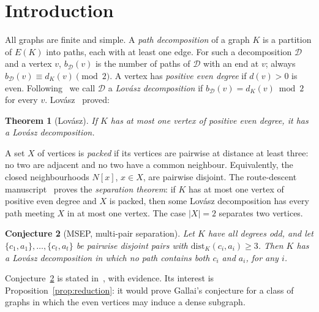\documentclass[11pt]{amsart}
\newtheorem{theorem}{Theorem}
\newtheorem{conjecture}[theorem]{Conjecture}
\theoremstyle{definition}
\newcommand{\cD}{\mathcal D}
\begin{document}
\section{Introduction}\label{sec:intro}

All graphs are finite and simple. A \emph{path decomposition} of a graph $K$ is a partition of $E(K)$
into paths, each with at least one edge. For such a decomposition $\cD$ and a vertex $v$, $b_\cD(v)$ is
the number of paths of $\cD$ with an end at $v$; always $b_\cD(v)\equiv d_K(v)\pmod 2$. A vertex has
\emph{positive even degree} if $d(v)>0$ is even. Following~\cite{RD} we call $\cD$ a \emph{Lov\'asz
decomposition} if $b_\cD(v)=d_K(v)\bmod 2$ for every $v$. Lov\'asz~\cite{L68} proved:

\begin{theorem}[Lov\'asz]\label{thm:lovasz}
If $K$ has at most one vertex of positive even degree, it has a Lov\'asz decomposition.
\end{theorem}

A set $X$ of vertices is \emph{packed} if its vertices are pairwise at distance at least three: no two
are adjacent and no two have a common neighbour. Equivalently, the closed neighbourhoods $N[x]$,
$x\in X$, are pairwise disjoint. The route-descent manuscript~\cite{RD} proves the \emph{separation
theorem}: if $K$ has at most one vertex of positive even degree and $X$ is packed, then some Lov\'asz
decomposition has every path meeting $X$ in at most one vertex. The case $|X|=2$ separates two vertices.

\begin{conjecture}[MSEP, multi-pair separation]\label{conj:msep}
Let $K$ have all degrees odd, and let $\{c_1,a_1\},\dots,\{c_t,a_t\}$ be pairwise disjoint pairs with
$\mathrm{dist}_K(c_i,a_i)\ge3$. Then $K$ has a Lov\'asz decomposition in which no path contains both
$c_i$ and $a_i$, for any $i$.
\end{conjecture}

Conjecture~\ref{conj:msep} is stated in~\cite[Conjecture~8.1]{RD}, with evidence. Its interest is
Proposition~\ref{prop:reduction}: it would prove Gallai's conjecture for a class of graphs in which the
even vertices may induce a dense subgraph.
\end{document}
